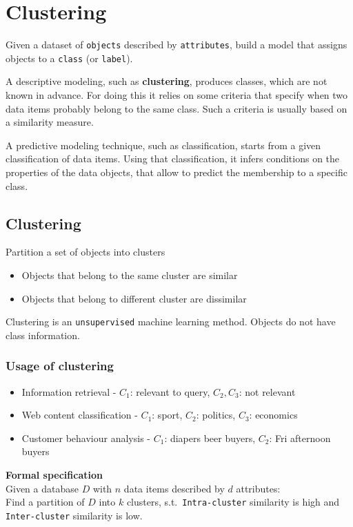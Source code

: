 \section{Clustering}

Given a dataset of \texttt{objects} described by \texttt{attributes},
build a model that assigns objects to a \texttt{class} (or
\texttt{label}).

A descriptive modeling, such as \textbf{clustering}, produces
classes, which are not known in advance. For doing this it relies on
some criteria that specify when two data items probably belong to the
same class. Such a criteria is usually based on a similarity measure.

A predictive modeling technique, such as classification, starts from a
given classification of data items. Using that classification, it
infers conditions on the properties of the data objects, that allow to
predict the membership to a specific class.

\subsection{Clustering}
Partition a set of objects into clusters
\begin{itemize}
\item Objects that belong to the same cluster are similar
\item Objects that belong to different cluster are dissimilar
\end{itemize}

Clustering is an \texttt{unsupervised} machine learning method.
Objects do not have class information.

\subsubsection{Usage of clustering}
\begin{itemize}
\item Information retrieval
  \quad - $ C_1 $: relevant to query, $ C_2, C_3 $: not relevant
\item Web content classification
  \quad - $ C_1 $: sport, $ C_2 $: politics, $ C_3 $: economics
\item Customer behaviour analysis
  \quad - $ C_1 $: diapers beer buyers, $ C_2 $: Fri afternoon buyers
\end{itemize}
\textbf{Formal specification} \\
Given a database $ D $ with $ n $ data items described by $ d $
attributes: \\
Find a partition of $ D $ into $ k $ clusters, s.t.\
\texttt{Intra-cluster} similarity is high and \texttt{Inter-cluster}
similarity is low.

